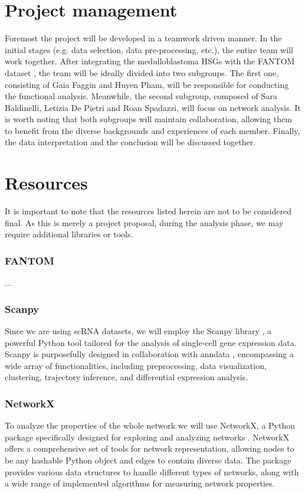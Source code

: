 \documentclass[10pt]{SelfArx} %
\begin{document}
\section{Project management}\label{sec:management}
Foremost the project will be developed in a teamwork driven manner. In the initial stages (e.g. data selection, data pre-processing, etc.), the entire team will work together. After integrating the medulloblastoma HSGs with the FANTOM dataset \cite{fantom5}, the team will be ideally divided into two subgroups. The first one, consisting of Gaia Faggin and Huyen Pham, will be responsible for conducting the functional analysis. Meanwhile, the second subgroup, composed of Sara Baldinelli, Letizia De Pietri and Roan Spadazzi, will focus on network analysis. It is worth noting that both subgroups will maintain collaboration, allowing them to benefit from the diverse backgrounds and experiences of each member. Finally, the data interpretation and the conclusion will be discussed together.

\section{Resources}\label{sec:resources}
It is important to note that the resources listed herein are not to be considered final. As this is merely a project proposal, during the analysis phase, we may require additional libraries or tools.

\subsubsection*{FANTOM}\label{fantom}
...

\subsubsection*{Scanpy}\label{sec:scanpy}
Since we are using scRNA datasets, we will employ the Scanpy library \cite{wolf2018scanpy}, a powerful Python tool tailored for the analysis of single-cell gene expression data. Scanpy is purposefully designed in collaboration with anndata \cite{virshup2021anndata}, encompassing a wide array of functionalities, including preprocessing, data visualization, clustering, trajectory inference, and differential expression analysis. 

\subsubsection*{NetworkX}\label{sec:networkX}
To analyze the properties of the whole network we will use NetworkX, a Python package specifically designed for exploring and analyzing networks \cite{hagberg2008exploring}. NetworkX offers a comprehensive set of tools for network representation, allowing nodes to be any hashable Python object and edges to contain diverse data. The package provides various data structures to handle different types of networks, along with a wide range of implemented algorithms for measuring network properties. 
\end{document}
